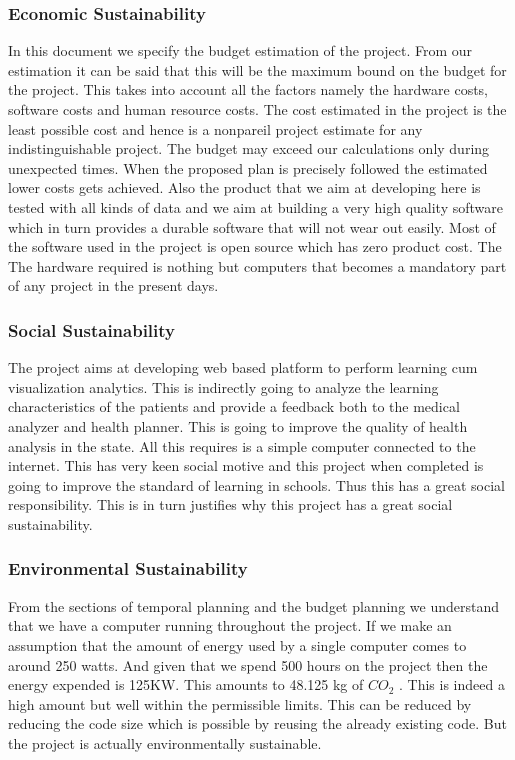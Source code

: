 \subsubsection{Economic Sustainability}
 In this document we specify
the budget estimation of the project. From our estimation it can be said that this will be the
maximum bound on the budget for the project. This takes into account all the factors namely
the hardware costs, software costs and human resource costs. The cost estimated in the project is the least possible cost and hence is a nonpareil project estimate for any indistinguishable project. The budget
may exceed our calculations only during unexpected times. When the proposed plan is precisely followed the estimated lower costs gets achieved. 
Also the product that we aim at developing here is tested with all kinds of data and we aim at
building a very high quality software which in turn provides a durable software that will not
wear out easily.  Most of the software used in the project is open source which has zero product cost. The The hardware required is nothing but computers that becomes a mandatory part
of any project in the present days.

\subsubsection{Social Sustainability}
The project aims at developing web based platform to perform learning cum visualization
analytics. This is indirectly going to analyze the learning characteristics of the patients and
provide a feedback both to the medical analyzer and health planner. This is going to improve
the quality of health analysis in the state. All this requires is a simple computer connected to
the internet. This has very keen social motive and this project when completed is going to
improve the standard of learning in schools. Thus this has a great social responsibility. This is in
turn justifies why this project has a great social sustainability.

\subsubsection{Environmental Sustainability}
From the sections of temporal planning and the budget planning we understand that we have a
computer running throughout the project. If we make an assumption that the amount of
energy used by a single computer comes to around 250 watts. And given that we spend 500
hours on the project then the energy expended is 125KW. This amounts to 48.125 kg of
$CO_2$ . This is indeed a high amount but well within the permissible limits. This can be reduced
by reducing the code size which is possible by reusing the already existing code. But the project
is actually environmentally sustainable.

